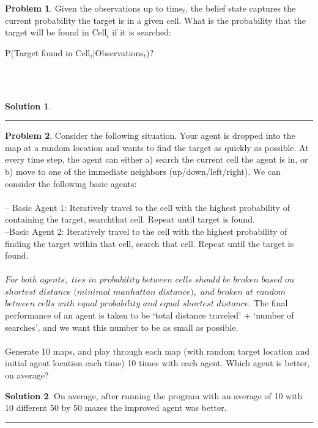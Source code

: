 \documentclass{article}
\theoremstyle{definition}
\newtheorem{problem}{Problem}
\def\fline{\rule{0.75\linewidth}{0.5pt}}
\newcommand{\finishline}{\vspace{-15pt}\begin{center}\fline\end{center}}
\newtheorem*{solution*}{Solution}
\newenvironment{solution}{\begin{solution*}}{{\finishline} \end{solution*}}
\begin{document}
\smallskip

\begin{problem}
Given the observations up to time$_{t}$, the belief state captures the current probability the target is in a given cell.  What is the probability that the target will be found in Cell$_{i}$ if it is searched:
\begin{center}
P(Target found in Cell$_{i}$$|$Observations$_{t}$)?
\end{center}
\end{problem}
\\\\
\smallskip
\begin{solution}
\end{solution}

\smallskip

\begin{problem}
Consider the following situation.  Your agent is dropped into the map at a random location and wants to find the target as quickly as possible.  At every time step, the agent can either a) search the current cell the agent is in, or b) move to one of the immediate neighbors (up/down/left/right).  We can consider the following basic agents:
\\\\
 – Basic Agent 1:  Iteratively travel to the cell with the highest probability of containing the target, searchthat cell.  Repeat until target is found.
 \\
 –Basic Agent 2:  Iteratively travel to the cell with the highest probability of finding the target within that cell, search that cell.  Repeat until the target is found.
 \\\\
 $For$ $both$ $agents,$ $ties$ $in$ $probability$ $between$ $cells$ $should$ $be$ $broken$ $based$ $on$ $shortest$ $distance$ $(minimal$ $manhattan$ $distance),$  $and$  $broken$  $at$  $random$  $between$  $cells$  $with$  $equal$  $probability$  $and$  $equal$  $shortest$  $distance.$
 The  final performance  of  an  agent  is  taken  to  be  ‘total  distance  traveled’  +  ‘number  of  searches’,  and  we  want  this number to be as small as possible.
 \\\\
 Generate 10 maps, and play through each map (with random target location and initial agent location each time) 10 times with each agent.  Which agent is better, on average?
\end{problem}
\smallskip
\begin{solution}
On average, after running the program with an average of 10 with 10 different 50 by 50 mazes the improved agent was better. 
\end{solution}
\end{document}
